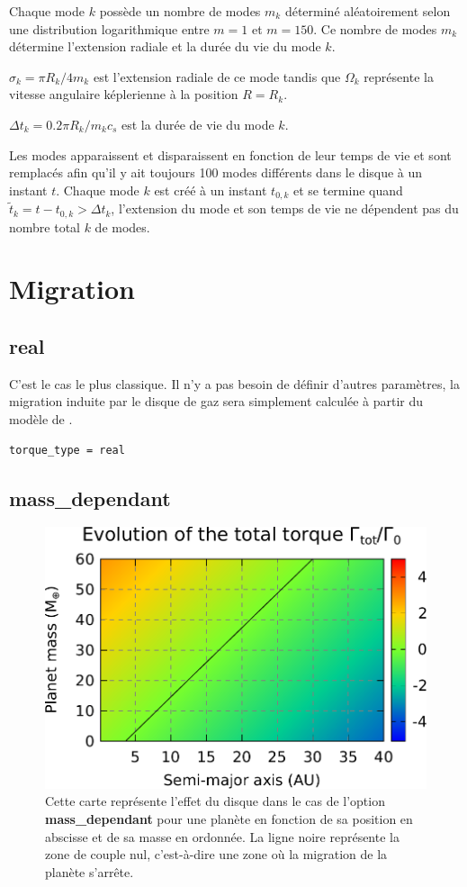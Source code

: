 Chaque mode $k$ possède un nombre de modes $m_k$ déterminé aléatoirement selon une distribution logarithmique entre $m=1$ et
$m=150$. Ce nombre de modes $m_k$ détermine l'extension radiale et la durée du vie du mode $k$.

$\sigma_k = \pi R_k / 4m_k$ est l'extension radiale de ce mode tandis que $\Omega_k$ représente la vitesse angulaire képlerienne à la position $R=R_k$.

$\Delta t_k=0.2\pi R_k / m_k c_s$ est la durée de vie du mode $k$. 

\bigskip

Les modes apparaissent et disparaissent en fonction de leur temps de vie et sont remplacés afin qu'il y ait toujours 100 modes différents dans le disque à un instant $t$. Chaque mode $k$ est créé à un instant $t_{0,k}$ et se termine quand $\tilde{t}_k = t-t_{0,k} > \Delta t_k$, l'extension du mode et son temps de vie ne dépendent pas du nombre total $k$ de modes.

\section{Migration}
\subsection{real}
C'est le cas le plus classique. Il n'y a pas besoin de définir d'autres paramètres, la migration induite par le disque de gaz sera simplement calculée à partir du modèle de \cite{paardekooper2011torque}.

\begin{verbatim}
torque_type = real
\end{verbatim}

\subsection{mass\_dependant}\label{sec:mass_dependant}
\begin{figure}[htbp]
\centering
\includegraphics[width=0.65\linewidth]{figure/migration_map/mass_dependant.pdf}
\caption[Carte de migration correspondant à une zone de convergence \textbf{mass\_dependant}.]{Cette carte représente
l'effet du disque dans le cas de l'option \textbf{mass\_dependant} pour une planète en fonction de sa position en abscisse et de
sa masse en ordonnée. La ligne noire représente la zone de couple nul, c'est-à-dire une zone où la migration de la planète
s'arrête.}
\end{figure}

